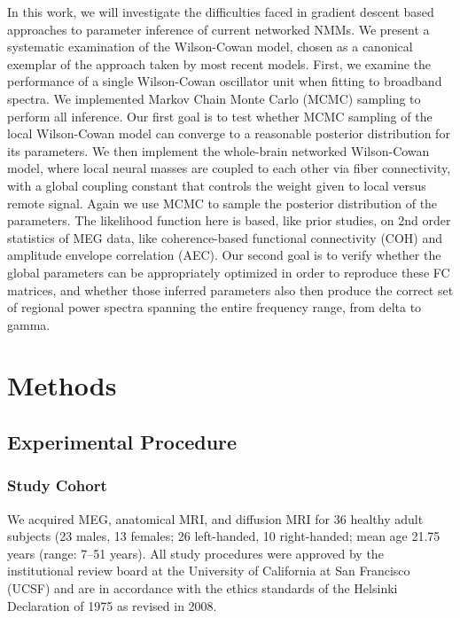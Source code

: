 In this work, we will investigate the difficulties faced in gradient descent based approaches to parameter inference of current networked NMMs. We present a systematic examination of the Wilson-Cowan model, chosen as a canonical exemplar of the approach taken by most recent models. First, we examine the performance of a single Wilson-Cowan oscillator unit when fitting to broadband spectra. We implemented Markov Chain Monte Carlo (MCMC) sampling to perform all inference. Our first goal is to test whether MCMC sampling of the local Wilson-Cowan model can converge to a reasonable posterior distribution for its parameters. We then implement the whole-brain networked Wilson-Cowan model, where local neural masses are coupled to each other via fiber connectivity, with a global coupling constant that controls the weight given to local versus remote signal.  Again we use MCMC to sample the posterior distribution of the parameters. The likelihood function here is based, like prior studies, on 2nd order statistics of MEG data, like  coherence-based functional connectivity (COH) and amplitude envelope correlation (AEC). Our second goal is to verify whether the global parameters can be appropriately optimized in order to reproduce these FC matrices, and whether those inferred parameters also then produce the correct set of regional power spectra spanning the entire frequency range, from delta to gamma. 

\section{Methods}

\subsection{Experimental Procedure}

\subsubsection{Study Cohort}
We acquired MEG, anatomical MRI, and diffusion MRI for 36 healthy adult subjects (23 males, 13 females; 26 left-handed, 10 right-handed; mean age 21.75 years (range: 7–51 years). All study procedures were approved by the institutional review board at the University of California at San Francisco (UCSF) and are in accordance with the ethics standards of the Helsinki Declaration of 1975 as revised in 2008.

